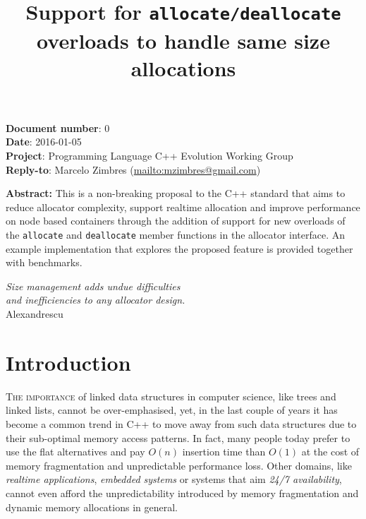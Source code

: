 \documentclass[11pt]{article}
\begin{document}
\date{}
\title{\bf Support for \texttt{allocate/deallocate} overloads to
handle same size allocations}

\vspace{-2cm}
\maketitle


\noindent
{\bf Document number}:  0 \\
{\bf Date}:  2016-01-05 \\
{\bf Project}: Programming Language C++ Evolution Working Group \\
{\bf Reply-to}: Marcelo Zimbres (\url{mailto:mzimbres@gmail.com}) 

\vspace{1cm}

\noindent
{\bf Abstract: }This is a non-breaking proposal to the C++ standard
that aims to reduce allocator complexity, support realtime allocation
and improve performance on node based containers through the addition
of support for new overloads of the \texttt{allocate} and
\texttt{deallocate} member functions in the allocator interface. An
example implementation that explores the proposed feature is provided
together with benchmarks.

\tableofcontents

\vfill
\begin{flushright}
\noindent
{\it Size management adds undue difficulties \\
     and inefficiencies to any allocator design.} \\
Alexandrescu \\
\medskip
{\it }
\end{flushright}
\medskip

\section{Introduction}
\textsc{The importance} of linked data structures in computer science,
like trees and linked lists, cannot be over-emphasised, yet, in the
last couple of years it has become a common trend in C++ to move away
from such data structures due to their sub-optimal memory access
patterns.  In fact, many people today prefer to use the flat
alternatives and pay $O(n)$ insertion time than $O(1)$ at the cost of
memory fragmentation and unpredictable performance loss. Other
domains, like {\it realtime applications}, {\it embedded systems} or
systems that aim {\it 24/7 availability}, cannot even afford the
unpredictability introduced by memory fragmentation and dynamic
memory allocations in general.
\end{document}
